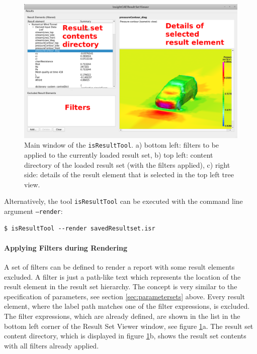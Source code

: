\begin{figure}[ht]
\includegraphics[width=\textwidth]{figs/isresulttool/InsightCAE_Result_Set_Viewer}
\caption{Main window of the \texttt{isResultTool}. a) bottom left: filters to be applied to the currently loaded result set, b) top left: content directory of the loaded result set (with the filters applied), c) right side: details of the result element that is selected in the top left tree view.}
\label{fig:isresulttoolmainwindow}
\end{figure}

Alternatively, the tool \texttt{isResultTool} can be executed with the command line argument \texttt{--render}:
\begin{lstlisting}
$ isResultTool --render savedResultset.isr
\end{lstlisting}



\paragraph{Applying Filters during Rendering}
\label{sec:resultsetfiltering}

A set of filters can be defined to render a report with some result elements excluded.
A filter is just a path-like text which represents the location of the result element in the result set hierarchy.
The concept is very similar to the specification of parameters, see section \ref{sec:parametersets} above.
Every result element, where the label path matches one of the filter expressions, is excluded.
The filter expressions, which are already defined, are shown in the list in the bottom left corner of the Result Set Viewer window, see figure \ref{fig:isresulttoolmainwindow}a.
The result set content directory, which is displayed in figure \ref{fig:isresulttoolmainwindow}b, shows the result set contents with all filters already applied.


